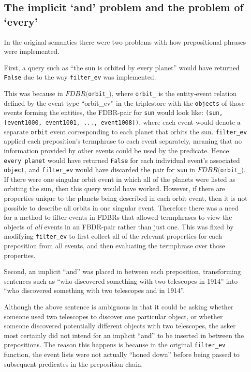 \documentclass[../main.tex]{subfiles}
\begin{document}
\subsection{The implicit `and' problem and the problem of `every'}

In the original semantics there were two problems with how prepositional phrases were implemented.

First, a query such as ``the sun is orbited by every planet'' would have returned \texttt{False} due to the way \texttt{filter\_ev} was implemented.

This was because in $FDBR($\texttt{orbit\_}$)$, where \texttt{orbit\_} is the entity-event relation defined by the event type ``orbit\_ev'' in the triplestore with the \texttt{objects} of those events forming the entities, the FDBR-pair for \texttt{sun} would look like: \texttt{(sun, [event1000, event1001, ..., event1008])}, where each event would denote a separate \texttt{orbit} event corresponding to each planet that orbits the sun.  \texttt{filter\_ev} applied each preposition's termphrase to each event separately, meaning that no information provided by other events could be used by the predicate.  Hence \texttt{every planet} would have returned \texttt{False} for each individual event's associated \texttt{object}, and \texttt{filter\_ev} would have discarded the pair for \texttt{sun} in $FDBR($\texttt{orbit\_}$)$.  If there were one singular orbit event in which all of the planets were listed as orbiting the sun, then this query would have worked.  However, if there are properties unique to the planets being described in each orbit event, then it is not possible to describe all orbits in one singular event.  Therefore there was a need for a method to filter events in FDBRs that allowed termphrases to view the objects of {\em all} events in an FBDR-pair rather than just one.  This was fixed by modifying \texttt{filter\_ev} to first collect all of the relevant properties for each preposition from all events,  and then evaluating the termphrase over those properties.
 
Second, an implicit ``and'' was placed in between each preposition, transforming sentences such as ``who discovered something with two telescopes in 1914'' into ``who discovered something with two telescopes and in 1914''.

Although the above sentence is ambiguous in that it could be asking whether someone used two telescopes to discover one particular object, or whether
someone discovered potentially different objects with two telescopes, the asker most certainly did not intend for an implicit ``and'' to be inserted in between the prepositions.
The reason this happens is because in the original \texttt{filter\_ev} function, the event lists were not actually ``honed down'' before being passed to subsequent predicates in the preposition chain.
\end{document}

